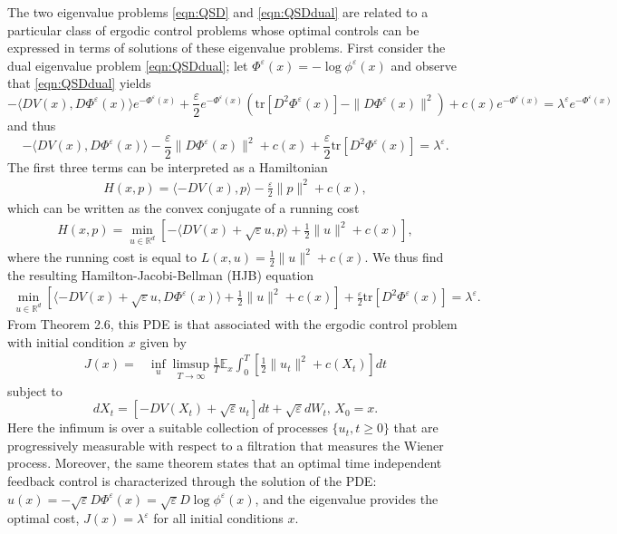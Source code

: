 \documentclass[english,11pt]{article}%
\newcommand{\tr}{\text{tr}}
\numberwithin{equation}{section}
\numberwithin{example}{section}
\numberwithin{theorem}{section}
\begin{document}
The two eigenvalue problems \eqref{eqn:QSD} and \eqref{eqn:QSDdual} are related to a particular class of ergodic control problems whose optimal controls can be expressed in terms of solutions of these eigenvalue problems. First consider the dual eigenvalue problem \eqref{eqn:QSDdual}; let $\Phi^\varepsilon(x) = - \log \phi^\varepsilon(x)$ and observe that \eqref{eqn:QSDdual} yields
\[
     - \langle D V(x), D \Phi^\varepsilon(x) \rangle e^{-\Phi^\varepsilon(x)} + \frac{\varepsilon}{2}e^{-\Phi^\varepsilon(x)}\left( \text{tr}[ D^2 \Phi^\varepsilon(x) ]- \|D \Phi^\varepsilon(x) \|^2 \right) + c(x) e^{-\Phi^\varepsilon(x)} = \lambda^\varepsilon e^{-\Phi^\varepsilon(x)} 
     \]
     and thus
     \[
      - \langle D V(x), D \Phi^\varepsilon(x) \rangle -\frac{\varepsilon}{2} \|D \Phi^\varepsilon(x) \|^2  + c(x)  + \frac{\varepsilon}{2} \text{tr}[ D^2 \Phi^\varepsilon(x) ] = \lambda^\varepsilon.
\]
The first three terms can be interpreted as a Hamiltonian
\begin{align}
    H(x,p) =  \langle -D V(x),p \rangle -\frac{\varepsilon}{2} \|p \|^2  + c(x),
\end{align}
which can be written as the convex conjugate of a running cost
\begin{align}
    H(x,p) = \min_{u\in \mathbb{R}^d} \left[ - \langle D V(x) + \sqrt{\varepsilon} u,p \rangle   + \frac{1}{2}\|u\|^2+ c(x)\right],
\end{align}
where the running cost is equal to $L(x,u) =\frac{1}{2}\|u\|^2 + c(x)$. We thus find the resulting Hamilton-Jacobi-Bellman (HJB) equation
\begin{align}
    \min_{u\in \mathbb{R}^d} \left[  \langle -D V(x) + \sqrt{\varepsilon} u,D\Phi^\varepsilon(x) \rangle   + \frac{1}{2}\|u\|^2+ c(x)\right] + \frac{\varepsilon}{2}\tr[D^2 \Phi^\varepsilon(x)] = \lambda^\varepsilon.
\end{align}
From \cite{buddupnyqwu} Theorem 2.6, this PDE is that associated with the ergodic control problem with initial condition $x$ given by 
\begin{align}
J(x) =  &\inf_{u} \limsup_{T \to \infty} \frac{1}{T} \mathbb{E}_x \int_0^T \left[\frac{1}{2} \|u_t\|^2 + c(X_t) \right] dt  
\end{align}
subject to 
\[
 dX_t = \left[ -DV(X_t) + \sqrt{\varepsilon}u_t \right] dt + \sqrt{\varepsilon}dW_t, \, X_0 = x. \nonumber
\]
Here the infimum is over a suitable collection of processes $\{u_t,t\geq 0\}$
that are progressively measurable with respect to a filtration that measures the Wiener process.
Moreover, the same theorem states that an optimal time independent feedback control is characterized through the solution of the PDE: $u(x) = -\sqrt{\varepsilon} D \Phi^\varepsilon(x) = \sqrt{\varepsilon}D \log \phi^\varepsilon(x)$, and the eigenvalue provides the optimal cost, $J(x) = \lambda^\varepsilon$ for all initial conditions $x$. 
\end{document}

